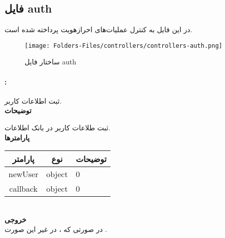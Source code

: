 \subsection{فایل auth}
در این فایل به کنترل عملیات‌های احرازهویت پرداخته شده است.
\begin{figure}[H]
	\texttt{[image: Folders-Files/controllers/controllers-auth.png]}
	\centering
	\caption{ساختار فایل auth}
	\label{fig:file:controllers:auth}
\end{figure}

\paragraph{:}
ثبت اطلاعات کاربر.
\\
\textbf{توضیحات}
\hr
\begin{flushleft}
	\framebox[.9\textwidth][l]{
		\lr{
			\textcolor{type}{void}
			\textcolor{func}{setUser}
			\textcolor{symb}{(}
			\textcolor{type}{object}
			\textcolor{arg}{newUser}
			\textcolor{symb}{,}
			\textcolor{type}{object}
			\textcolor{arg}{callback}
			\textcolor{symb}{);}
		}
	}
\end{flushleft}
ثبت طلاعات کاربر در بانک اطلاعات.
\\
\textbf{پارامترها}
\hr \\[10pt]
\begin{tabular}{|m{4cm}|m{3cm}|m{10cm}|}
	\hline
	\multicolumn{1}{|c}{پارامتر}
	&
	\multicolumn{1}{|c}{نوع}
	&
	\multicolumn{1}{|c|}{توضیحات}
	\\
	\hline
	\multicolumn{1}{|c}{newUser}
	&
	\multicolumn{1}{|c|}{object}
	&
0
	\\
	\hline
	\multicolumn{1}{|c}{callback}
	&
	\multicolumn{1}{|c|}{object}
	&
0
	\\
	\hline
\end{tabular}
\\[10pt]
\textbf{خروجی}
\hr \\
در صورتی که ، در غیر این صورت .


